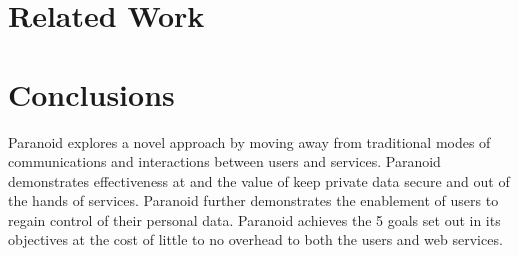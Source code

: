 \documentclass[letterpaper,twocolumn,10pt]{article}
\begin{document}
\section{Related Work}


\section{Conclusions}

Paranoid explores a novel approach by moving away from traditional modes of communications and interactions between users and services. Paranoid demonstrates effectiveness at and the value of keep private data secure and out of the hands of services. Paranoid further demonstrates the enablement of users to regain control of their personal data. Paranoid achieves the 5 goals set out in its objectives at the cost of little to no overhead to both the users and web services.





\end{document}
